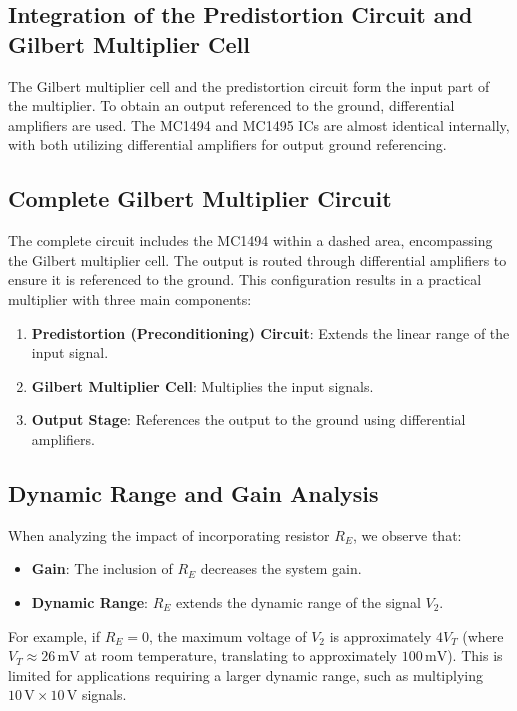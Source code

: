 \documentclass[a4paper,9pt,twoside,openany,twocolumn]{memoir}
\begin{document}
\subsection{Integration of the Predistortion Circuit and Gilbert Multiplier Cell}

The Gilbert multiplier cell and the predistortion circuit form the input part of the multiplier. To obtain an output referenced to the ground, differential amplifiers are used. The MC1494 and MC1495 ICs are almost identical internally, with both utilizing differential amplifiers for output ground referencing.

\subsection{Complete Gilbert Multiplier Circuit}

The complete circuit includes the MC1494 within a dashed area, encompassing the Gilbert multiplier cell. The output is routed through differential amplifiers to ensure it is referenced to the ground. This configuration results in a practical multiplier with three main components:
\begin{enumerate}
    \item \textbf{Predistortion (Preconditioning) Circuit}: Extends the linear range of the input signal.
    \item \textbf{Gilbert Multiplier Cell}: Multiplies the input signals.
    \item \textbf{Output Stage}: References the output to the ground using differential amplifiers.
\end{enumerate}

\subsection{Dynamic Range and Gain Analysis}

When analyzing the impact of incorporating resistor $R_E$, we observe that:
\begin{itemize}
    \item \textbf{Gain}: The inclusion of $R_E$ decreases the system gain.
    \item \textbf{Dynamic Range}: $R_E$ extends the dynamic range of the signal $V_2$.
\end{itemize}

For example, if $R_E = 0$, the maximum voltage of $V_2$ is approximately $4V_T$ (where $V_T \approx 26\,\text{mV}$ at room temperature, translating to approximately $100\,\text{mV}$). This is limited for applications requiring a larger dynamic range, such as multiplying $10\,\text{V} \times 10\,\text{V}$ signals.
\end{document}
